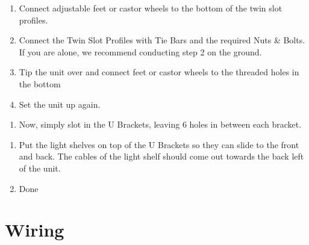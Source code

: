 \documentclass[letterpaper,10pt,english]{sphinxmanual}
\begin{document}
\noindent{}

\noindent{}
\begin{enumerate}
%
\setcounter{enumi}{1}
\item {} 
Connect adjustable feet or castor wheels to the bottom of the twin slot profiles.

\item {} 
Connect the Twin Slot Profiles with Tie Bars and the required Nuts \& Bolts. If you are alone, we recommend conducting step 2 on the ground.

\item {} 
Tip the unit over and connect feet or castor wheels to the threaded holes in the bottom

\item {} 
Set the unit up again.

\end{enumerate}

\noindent{}
\begin{enumerate}
%
\setcounter{enumi}{5}
\item {} 
Now, simply slot in the U Brackets, leaving 6 holes in between each bracket.

\end{enumerate}

\noindent{}
\begin{enumerate}
%
\setcounter{enumi}{6}
\item {} 
Put the light shelves on top of the U Brackets so they can slide to the front and back. The cables of the light shelf should come out towards the back left of the unit.

\item {} 
Done

\end{enumerate}


\section{Wiring}
\label{\detokenize{wiring:wiring}}\label{\detokenize{wiring::doc}}
\noindent{}
\end{document}
